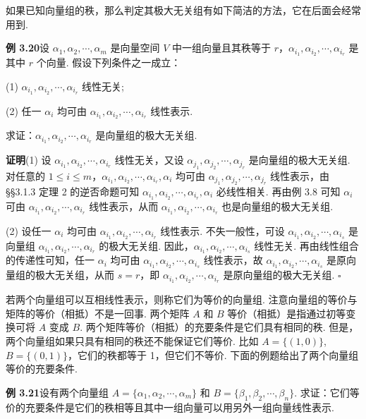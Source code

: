 \documentclass[UTF8, 12pt, fontset=fandol, oneside]{ctexart}
\begin{document}
如果已知向量组的秩，那么判定其极大无关组有如下简洁的方法，它在后面会经常用到.

\noindent\textbf{例 3.20}\quad 设 $\alpha_1,\alpha_2,\cdots,\alpha_m$ 是向量空间 $V$ 中一组向量且其秩等于 $r$，$\alpha_{i_1},\alpha_{i_2},\cdots,\alpha_{i_r}$ 是其中 $r$ 个向量. 假设下列条件之一成立：

(1) $\alpha_{i_1},\alpha_{i_2},\cdots,\alpha_{i_r}$ 线性无关;

(2) 任一 $\alpha_i$ 均可由 $\alpha_{i_1},\alpha_{i_2},\cdots,\alpha_{i_r}$ 线性表示.

求证：$\alpha_{i_1},\alpha_{i_2},\cdots,\alpha_{i_r}$ 是向量组的极大无关组.

\noindent\textbf{证明}\quad (1) 设 $\alpha_{i_1},\alpha_{i_2},\cdots,\alpha_{i_r}$ 线性无关，又设 $\alpha_{j_1},\alpha_{j_2},\cdots,\alpha_{j_r}$ 是向量组的极大无关组. 对任意的 $1\le i\le m$，$\alpha_{i_1},\alpha_{i_2},\cdots,\alpha_{i_r},\alpha_i$ 均可由 $\alpha_{j_1},\alpha_{j_2},\cdots,\alpha_{j_r}$ 线性表示，由 §§3.1.3 定理 2 的逆否命题可知 $\alpha_{i_1},\alpha_{i_2},\cdots,\alpha_{i_r},\alpha_i$ 必线性相关. 再由例 3.8 可知 $\alpha_i$ 可由 $\alpha_{i_1},\alpha_{i_2},\cdots,\alpha_{i_r}$ 线性表示，从而 $\alpha_{i_1},\alpha_{i_2},\cdots,\alpha_{i_r}$ 也是向量组的极大无关组.

(2) 设任一 $\alpha_i$ 均可由 $\alpha_{i_1},\alpha_{i_2},\cdots,\alpha_{i_r}$ 线性表示. 不失一般性，可设 $\alpha_{i_1},\alpha_{i_2},\cdots,\alpha_{i_s}$ 是向量组 $\alpha_{i_1},\alpha_{i_2},\cdots,\alpha_{i_r}$ 的极大无关组. 因此，$\alpha_{i_1},\alpha_{i_2},\cdots,\alpha_{i_s}$ 线性无关. 再由线性组合的传递性可知，任一 $\alpha_i$ 均可由 $\alpha_{i_1},\alpha_{i_2},\cdots,\alpha_{i_s}$ 线性表示，故 $\alpha_{i_1},\alpha_{i_2},\cdots,\alpha_{i_s}$ 是原向量组的极大无关组，从而 $s=r$，即 $\alpha_{i_1},\alpha_{i_2},\cdots,\alpha_{i_r}$ 是原向量组的极大无关组. $\square$

若两个向量组可以互相线性表示，则称它们为等价的向量组. 注意向量组的等价与矩阵的等价（相抵）不是一回事. 两个矩阵 $A$ 和 $B$ 等价（相抵）是指通过初等变换可将 $A$ 变成 $B$. 两个矩阵等价（相抵）的充要条件是它们具有相同的秩. 但是，两个向量组如果只具有相同的秩还不能保证它们等价. 比如 $A=\{(1,0)\}$, $B=\{(0,1)\}$，它们的秩都等于 1，但它们不等价. 下面的例题给出了两个向量组等价的充要条件.

\noindent\textbf{例 3.21}\quad 设有两个向量组 $A=\{\alpha_1,\alpha_2,\cdots,\alpha_m\}$ 和 $B=\{\beta_1,\beta_2,\cdots,\beta_n\}$. 求证：它们等价的充要条件是它们的秩相等且其中一组向量可以用另外一组向量线性表示.
\end{document}

